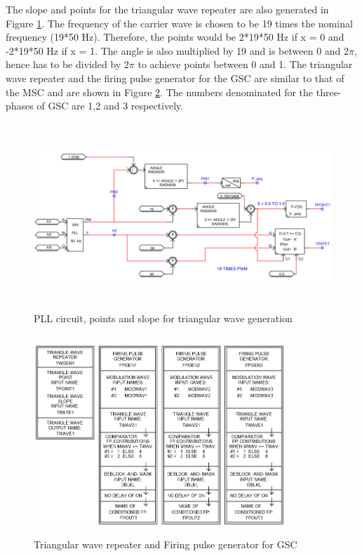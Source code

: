 The slope and points for the triangular wave repeater are also generated in Figure \ref{fig:PLL_model}. The frequency of the carrier wave is chosen to be 19 times the nominal frequency (19*50 Hz). Therefore, the points would be 2*19*50 Hz if x = 0 and -2*19*50 Hz if x = 1. The angle is also multiplied by 19 and is between 0 and 2$\pi$, hence has to be divided by 2$\pi$ to achieve points between 0 and 1. The triangular wave repeater and the firing pulse generator for the \gls{GSC} are similar to that of the \gls{MSC} and are shown in Figure \ref{fig:Firing_blocks_GSC}. The numbers denominated for the three-phases of \gls{GSC} are 1,2 and 3 respectively.


\begin{figure}[H]
\centering
    \includegraphics[height = 7cm,width = 15.5cm]{Diagrams/Appendix_A/PLL_model.PNG}
    \caption{PLL circuit, points and slope for triangular wave generation}
    \label{fig:PLL_model}
\end{figure}

\begin{figure}[H]
\centering
    \includegraphics[height = 7.5cm,width = 9.5cm]{Diagrams/Appendix_A/Firing_blocks_GSC.PNG}
    \caption{Triangular wave repeater and Firing pulse generator for GSC}
    \label{fig:Firing_blocks_GSC}
\end{figure}

